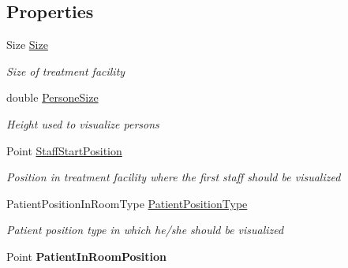 \subsection*{Properties}
\begin{DoxyCompactItemize}
\item 
Size \hyperlink{class_simulation_w_p_f_visualization_tools_1_1_health_care_objects_1_1_draw_base_treatment_facility_a83f48a13fa5f4f714e22088818f2038a}{Size}
\begin{DoxyCompactList}\small\item\em Size of treatment facility \end{DoxyCompactList}\item 
double \hyperlink{class_simulation_w_p_f_visualization_tools_1_1_health_care_objects_1_1_draw_base_treatment_facility_a3b6d79707960dd5b61e6eb4c806cbc1b}{Persone\+Size}
\begin{DoxyCompactList}\small\item\em Height used to visualize persons \end{DoxyCompactList}\item 
Point \hyperlink{class_simulation_w_p_f_visualization_tools_1_1_health_care_objects_1_1_draw_base_treatment_facility_a258b993c06163cc3da0d3beb91b6e344}{Staff\+Start\+Position}
\begin{DoxyCompactList}\small\item\em Position in treatment facility where the first staff should be visualized \end{DoxyCompactList}\item 
Patient\+Position\+In\+Room\+Type \hyperlink{class_simulation_w_p_f_visualization_tools_1_1_health_care_objects_1_1_draw_base_treatment_facility_a72a332150c43cfcea5695a0d92e0523c}{Patient\+Position\+Type}
\begin{DoxyCompactList}\small\item\em Patient position type in which he/she should be visualized \end{DoxyCompactList}\item 
Point {\bfseries Patient\+In\+Room\+Position}\hypertarget{class_simulation_w_p_f_visualization_tools_1_1_health_care_objects_1_1_draw_base_treatment_facility_ae1c9e87f8c44fddcdc1603505b2a5f61}{}\label{class_simulation_w_p_f_visualization_tools_1_1_health_care_objects_1_1_draw_base_treatment_facility_ae1c9e87f8c44fddcdc1603505b2a5f61}

\end{DoxyCompactItemize}
